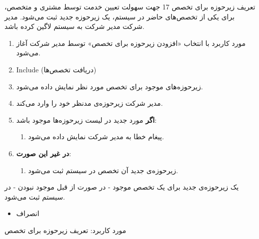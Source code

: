 {
\usecase
{تعریف زیرحوزه برای تخصص}
{17}
{جهت سهولت تعیین خدمت توسط مشتری و متخصص، برای یکی از تخصص‌های حاضر در سیستم، یک زیرحوزه جدید ثبت می‌شود.}
{مدیر شرکت}
{}
{مدیر شرکت به سیستم لاگین کرده باشد.}
{
	\vspace*{-0.6cm}
	\begin{enumerate}
		\item 
		مورد کاربرد با انتخاب «افزودن زیرحوزه برای تخصص» توسط مدیر شرکت آغاز می‌شود.
		\item Include (دریافت تخصص‌ها)
		\item زیرحوزه‌های موجود برای تخصص مورد نظر نمایش داده می‌شود.
		\item مدیر شرکت زیرحوزه‌ی مدنظر خود را وارد می‌کند. 
		\item
		\textbf{اگر}
		مورد جدید در لیست زیرحوزه‌ها موجود باشد:
		\begin{enumerate}[label=\theenumi.\arabic*.]
			\item پیغام خطا به مدیر شرکت نمایش داده می‌شود.
		\end{enumerate}
		\item
		\textbf{در غیر این صورت}:
		\begin{enumerate}[label=\theenumi.\arabic*.]
			\item زیرحوزه‌ی جدید آن تخصص در سیستم ثبت می‌شود.
		\end{enumerate}		
	\end{enumerate}
}
{یک زیرحوزه‌ی جدید برای یک تخصص موجود - در صورت از قبل موجود نبودن - در سیستم ثبت می‌شود.}
{
	\begin{itemize}
		\vspace*{-0.6cm}
		\item انصراف
	\end{itemize}
}
{
	مورد کاربرد: تعریف زیرحوزه برای تخصص
}

}


